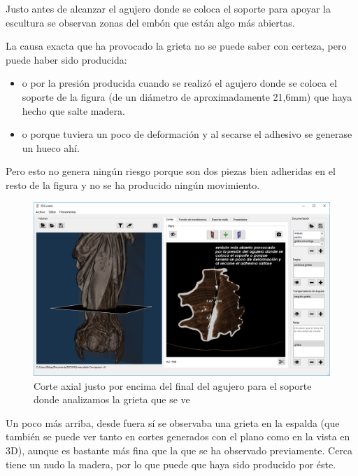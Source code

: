 Justo antes de alcanzar el agujero donde se coloca el soporte para apoyar la escultura se observan zonas del embón que están algo más abiertas. 

La causa exacta que ha provocado la grieta no se puede saber con certeza, pero puede haber sido producida:

\begin{itemize}
	\item o por la presión producida cuando se realizó el agujero donde se coloca el soporte de la figura (de un diámetro de aproximadamente 21,6mm) que haya hecho que salte madera.
	\item o porque tuviera un poco de deformación y al secarse el adhesivo se generase un hueco ahí.
\end{itemize}

Pero esto no genera ningún riesgo porque son dos piezas bien adheridas en el resto de la figura y no se ha producido ningún movimiento.

\begin{figure}[H]
	\centering
	\includegraphics[width=12.5cm]{imagenes/resultados/documentacion/inmaculada-concepcion/grieta-zona-baja}
	\caption{Corte axial justo por encima del final del agujero para el soporte donde analizamos la grieta que se ve}
	\label{fig:resultados/documentacion/inmaculada-concepcion/grieta-zona-baja}
\end{figure}

Un poco más arriba, desde fuera sí se observaba una grieta en la espalda (que también se puede ver tanto en cortes generados con el plano como en la vista en 3D), aunque es bastante más fina que la que se ha observado previamente. Cerca tiene un nudo la madera, por lo que puede que haya sido producido por éste.

